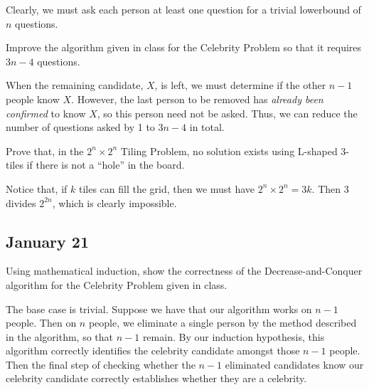 \documentclass[draft]{article}
\begin{document}
\begin{solution}
    Clearly, we must ask each person at least one question for a trivial lowerbound of $n$ questions.
\end{solution}

\begin{question}
    Improve the algorithm given in class for the Celebrity Problem so that it requires $3n - 4$ questions.
\end{question}

\begin{solution}
    When the remaining candidate, $X$, is left, we must determine if the other $n - 1$ people know $X$. However, the last person to be removed has \emph{already been confirmed} to know $X$, so this person need not be asked. Thus, we can reduce the number of questions asked by 1 to $3n - 4$ in total.
\end{solution}

\begin{question}
    Prove that, in the $2^n \times 2^n$ Tiling Problem, no solution exists using L-shaped 3-tiles if there is not a ``hole'' in the board.
\end{question}

\begin{solution}
    Notice that, if $k$ tiles can fill the grid, then we must have $2^n \times 2^n = 3k$. Then $3$ divides $2^{2n}$, which is clearly impossible.
\end{solution}

\subsection{January 21}
\begin{question}
    Using mathematical induction, show the correctness of the Decrease-and-Conquer algorithm for the Celebrity Problem given in class.
\end{question}

\begin{solution}
    The base case is trivial. Suppose we have that our algorithm works on $n - 1$ people. Then on $n$ people, we eliminate a single person by the method described in the algorithm, so that $n - 1$ remain. By our induction hypothesis, this algorithm correctly identifies the celebrity candidate amongst those $n - 1$ people. Then the final step of checking whether the $n - 1$ eliminated candidates know our celebrity candidate correctly establishes whether they are a celebrity.
\end{solution}
\end{document}
